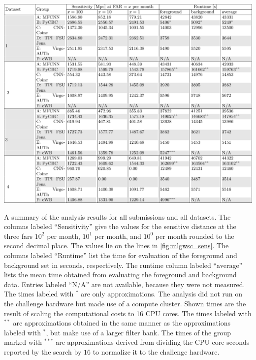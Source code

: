 \begin{table}[]
    \centering
    \includegraphics[width=\textwidth]{chapters/mdc/images/long_table}
    \caption[Results]{A summary of the analysis results for all submissions and all datasets. The columns labeled ``Sensitivity'' give the values for the sensitive distance at the three \acrshort{far}s $10^2$ per month, $10^1$ per month, and $10^0$ per month rounded to the second decimal place. The values lie on the lines in \autoref{fig:mlgwsc_sens}. The columns labeled ``Runtime'' list the time for evaluation of the foreground and background set in seconds, respectively. The runtime column labeled ``average'' lists the mean time obtained from evaluating the foreground and background data. Entries labeled ``N/A'' are not available, because they were not measured. The \pycbc times labeled with $^\ast$ are only approximations. The analysis did not run on the challenge hardware but made use of a compute cluster. Shown times are the result of scaling the computational costs to 16 CPU cores. The \pycbc times labeled with $^{\ast\ast}$ are approximations obtained in the same manner as the approximations labeled with $^\ast$, but make use of a larger filter bank. The times of the \cwb group marked with $^{\ast\ast\ast}$ are approximations derived from dividing the CPU core-seconds reported by the search by $16$ to normalize it to the challenge hardware.}
    \label{tab:res}
\end{table}

